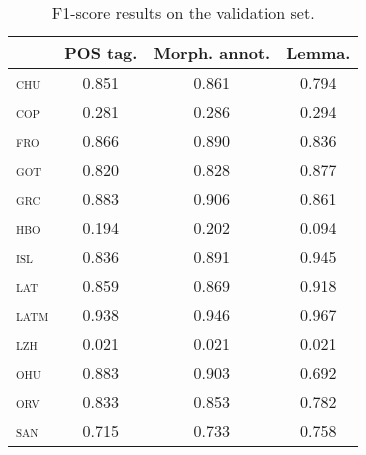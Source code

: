 \documentclass{../acl_latex.tex}
\begin{document}
\begin{table}[t]
\centering
\begin{tabular}{lccc}
\toprule
                 & POS tag. & Morph. annot. & Lemma. \\ \midrule
\textsc{chu}     &  0.851   &  0.861        & 0.794  \\ 
\textsc{cop}     &  0.281   &  0.286        & 0.294  \\ 
\textsc{fro}     &  0.866   &  0.890        & 0.836  \\
\textsc{got}     &  0.820   &  0.828        & 0.877  \\
\textsc{grc}     &  0.883   &  0.906        & 0.861  \\
\textsc{hbo}     &  0.194   &  0.202        & 0.094  \\
\textsc{isl}     &  0.836   &  0.891        & 0.945  \\
\textsc{lat}     &  0.859   &  0.869        & 0.918  \\
\textsc{latm}    &  0.938   &  0.946        & 0.967  \\
\textsc{lzh}     &  0.021   &  0.021        & 0.021  \\
\textsc{ohu}     &  0.883   &  0.903        & 0.692  \\
\textsc{orv}     &  0.833   &  0.853        & 0.782  \\
\textsc{san}     &  0.715   &  0.733        & 0.758  \\ \bottomrule 
\end{tabular}
\caption{
    F1-score results on the validation set.
}
\label{table:validation_results}
\end{table}
\end{document}
